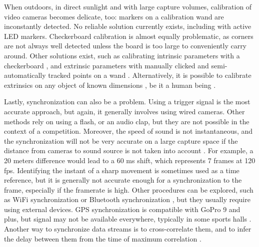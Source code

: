 When outdoors, in direct sunlight and with large capture volumes, calibration of video cameras becomes delicate, too: markers on a calibration wand are inconstantly detected. No reliable solution currently exists, including with active LED markers. Checkerboard calibration is almost equally problematic, as corners are not always well detected unless the board is too large to conveniently carry around. Other solutions exist, such as calibrating intrinsic parameters with a checkerboard \cite{Zhang2000}, and extrinsic parameters with manually clicked and semi-automatically tracked points on a wand \cite{Argus2017}. 
Alternatively, it is possible to calibrate extrinsics on any object of known dimensions \cite{Dawson-Howe1994}, be it a human being \cite{Liu2022a}.

Lastly, synchronization can also be a problem. Using a trigger signal is the most accurate approach, but again, it generally involves using wired cameras. Other methods rely on using a flash, or an audio clap, but they are not possible in the context of a competition. Moreover, the speed of sound is not instantaneous, and the synchronization will not be very accurate on a large capture space if the distance from cameras to sound source is not taken into account \cite{Hasler2009}. For example, a 20 meters difference would lead to a 60 ms shift, which represents 7 frames at 120 fps. Identifying the instant of a sharp movement is sometimes used as a time reference, but it is generally not accurate enough for a synchronization to the frame, especially if the framerate is high. Other procedures can be explored, such as WiFi synchronization \cite{Romanov2019} or Bluetooth synchronization \cite{Asgarian2022}, but they usually require using external devices. GPS synchronization is compatible with GoPro 9 and plus, but signal may not be available everywhere, typically in some sports halls \cite{GoPro2022}. Another way to synchronize data streams is to cross-correlate them, and to infer the delay between them from the time of maximum correlation \cite{Plotz2012}. 


